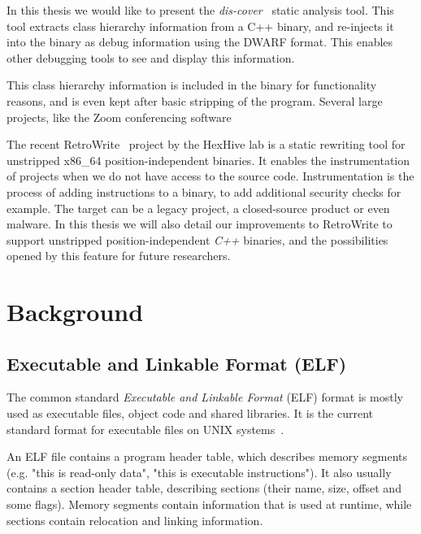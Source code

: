 \documentclass[a4paper,11pt,oneside]{report}
\begin{document}
In this thesis we would like to present the 
\emph{dis-cover}~\cite{discovergithub} static analysis tool.
This tool extracts class hierarchy information from a C++ binary, and
re-injects it into the binary as debug information using the DWARF format.
This enables other debugging tools to see and display this information.

This class hierarchy information is included in the binary for functionality
reasons, and is even kept after basic stripping of the program.
Several large projects, like the Zoom conferencing software

The recent RetroWrite~\cite{dinesh20oakland} project by the HexHive lab is a 
static rewriting tool for unstripped x86\_64 position-independent binaries.
It enables the instrumentation of projects when we do not have access to the 
source code.
Instrumentation is the process of adding instructions to a binary, to add
additional security checks for example.
The target can be a legacy project, a closed-source product or even malware.
In this thesis we will also detail our improvements to RetroWrite to support
unstripped position-independent \emph{C++} binaries, and the possibilities
opened by this feature for future researchers.

\chapter{Background}




\section{Executable and Linkable Format (ELF)}

The common standard \emph{Executable and Linkable Format} (ELF) format is 
mostly used as executable files, object code and shared libraries.
It is the current standard format for executable files on UNIX
systems~\cite{elfstandard}.

An ELF file contains a program header table, which describes memory segments 
(e.g. "this is read-only data", "this is executable instructions").
It also usually contains a section header table, describing sections (their 
name, size, offset and some flags).
Memory segments contain information that is used at runtime, while sections
contain relocation and linking information.
\end{document}
